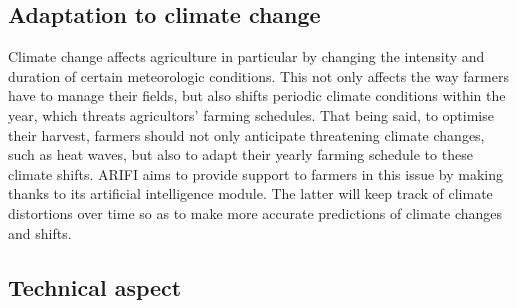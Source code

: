 \subsection{Adaptation to climate change}
Climate change affects agriculture in particular by changing the intensity and duration of certain meteorologic conditions. This not only affects the way farmers have to manage their fields, but also shifts periodic climate conditions within the year, which threats agricultors' farming schedules. That being said, to optimise their harvest, farmers should not only anticipate threatening climate changes, such as heat waves, but also to adapt their yearly farming schedule to these climate shifts.
ARIFI aims to provide support to farmers in this issue by making thanks to its artificial intelligence module. The latter will keep track of climate distortions over time so as to make more accurate predictions of climate changes and shifts.  

\subsection{Technical aspect}
